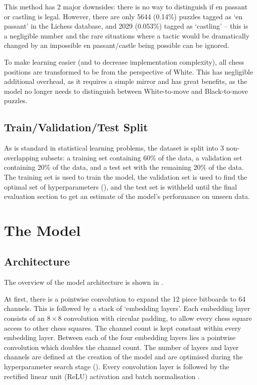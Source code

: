 This method has 2 major downsides: there is no way to distinguish if en passant
or castling is legal. However, there are only 5644 (0.14\%) puzzles tagged as
`en passant' in the Lichess database, and 2029 (0.053\%) tagged as `castling'
-- this is a negligible number and the rare situations where a tactic would be
dramatically changed by an impossible en passant/castle being possible can be
ignored.

To make learning easier (and to decrease implementation complexity), all chess
positions are transformed to be from the perspective of White. This has
negligible additional overhead, as it requires a simple mirror and has great
benefits, as the model no longer needs to distinguish between White-to-move and
Black-to-move puzzles.

\subsection{Train/Validation/Test Split}\label{mlS12}

As is standard in statistical learning problems, the dataset is split into 3
non-overlapping subsets: a training set containing 60\% of the data, a
validation set containing 20\% of the data, and a test set with the remaining
20\% of the data. The training set is used to train the model, the validation
set is used to find the optimal set of hyperparameters (), and the
test set is withheld until the final evaluation section to get an estimate of
the model's performance on unseen data. 

\section{The Model}\label{mlS2}

\subsection{Architecture}\label{mlS21}

The overview of the model architecture is shown in . 

At first, there is a pointwise convolution to expand the 12 piece bitboards to
64 channels. This is followed by a stack of `embedding layers'. Each embedding
layer consists of an $8\times8$ convolution with circular padding, to allow
every chess square access to other chess squares. The channel count is kept
constant within every embedding layer. Between each of the four embedding
layers lies a pointwise convolution which doubles the channel count. The number
of layers and layer channels are defined at the creation of the model and are
optimised during the hyperparameter search stage (). Every
convolution layer is followed by the rectified linear unit (ReLU) activation
and batch normalisation \citep{ioffe2015batch}.

